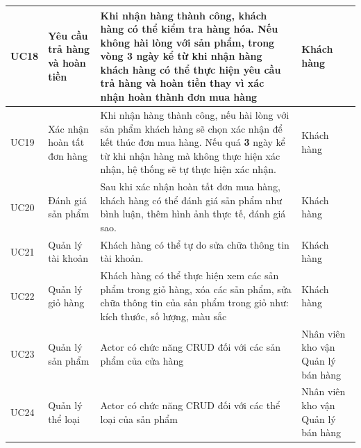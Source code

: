 \documentclass[12pt,a4paper,2sides]{report}
\begin{document}
\begin{tabular}{|p{1cm}|p{3cm}|p{6cm}|p{3cm}|}
\hline
UC18 & Yêu cầu trả hàng và hoàn tiền          & Khi nhận hàng thành công, khách hàng có thể kiểm tra hàng hóa. Nếu không hài lòng với sản phẩm, trong vòng 3 ngày kể từ khi nhận hàng khách hàng có thể thực hiện yêu cầu trả hàng và hoàn tiền thay vì xác nhận hoàn thành đơn mua hàng & Khách hàng                                                              \\ 
\hline
UC19 & Xác nhận hoàn tất đơn hàng             & Khi nhận hàng thành công, nếu hài lòng với sản phẩm khách hàng sẽ chọn xác nhận để kết thúc đơn mua hàng. Nếu quá \textbf{3} ngày kể từ khi nhận hàng mà không thực hiện xác nhận, hệ thống sẽ tự thực hiện xác nhận.                    & Khách hàng                                                              \\ 
\hline
UC20 & Đánh giá sản phẩm                      & Sau khi xác nhận hoàn tất đơn mua hàng, khách hàng có thể đánh giá sản phẩm như bình luận, thêm hình ảnh thực tế, đánh giá sao.                                                                                                          & Khách hàng                                                              \\ 
\hline
UC21 & Quản lý tài khoản                      & Khách hàng có thể tự do sửa chữa thông tin tài khoản.                                                                                                                                                                                    & Khách hàng                                                              \\ 
\hline
UC22 & Quản lý giỏ hàng                       & Khách hàng có thể thực hiện xem các sản phẩm trong giỏ hàng, xóa các sản phẩm, sửa chữa thông tin của sản phẩm trong giỏ như: kích thước, số lượng, màu sắc                                                                              & Khách hàng                                                              \\ 
\hline
UC23 & Quản lý sản phẩm                       & Actor có chức năng CRUD đối với các sản phẩm của cửa hàng                                                                                                                                                                                & Nhân viên kho vận Quản lý bán hàng                                      \\ 
\hline
UC24 & Quản lý thể loại                       & Actor có chức năng CRUD đối với các thể loại của sản phẩm                                                                                                                                                                                & Nhân viên kho vận Quản lý bán hàng                                      \\ 

\end{tabular}
\end{document}
